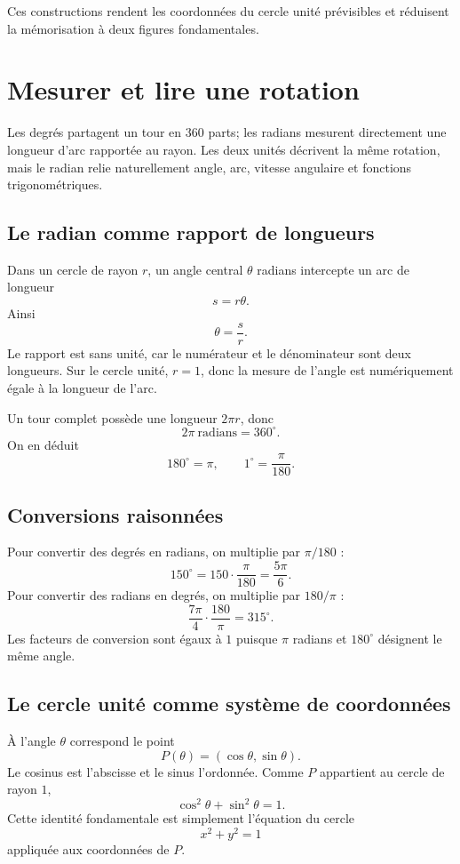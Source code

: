 \documentclass[12pt,a4paper,openany]{book}
\begin{document}
Ces constructions rendent les coordonnées du cercle unité prévisibles et réduisent la mémorisation à deux figures fondamentales.


\section{Mesurer et lire une rotation}

Les degrés partagent un tour en $360$ parts; les radians mesurent directement une longueur d'arc rapportée au rayon. Les deux unités décrivent la même rotation, mais le radian relie naturellement angle, arc, vitesse angulaire et fonctions trigonométriques.

\subsection{Le radian comme rapport de longueurs}

Dans un cercle de rayon $r$, un angle central $\theta$ radians intercepte un arc de longueur
\[
s=r\theta.
\]
Ainsi
\[
\theta=\frac sr.
\]
Le rapport est sans unité, car le numérateur et le dénominateur sont deux longueurs. Sur le cercle unité, $r=1$, donc la mesure de l'angle est numériquement égale à la longueur de l'arc.

Un tour complet possède une longueur $2\pi r$, donc
\[
2\pi\ \text{radians}=360^\circ.
\]
On en déduit
\[
180^\circ=\pi,
\qquad
1^\circ=\frac\pi{180}.
\]

\subsection{Conversions raisonnées}

Pour convertir des degrés en radians, on multiplie par $\pi/180$ :
\[
150^\circ=150\cdot\frac\pi{180}=\frac{5\pi}{6}.
\]
Pour convertir des radians en degrés, on multiplie par $180/\pi$ :
\[
\frac{7\pi}{4}\cdot\frac{180}{\pi}=315^\circ.
\]
Les facteurs de conversion sont égaux à $1$ puisque $\pi$ radians et $180^\circ$ désignent le même angle.

\subsection{Le cercle unité comme système de coordonnées}

À l'angle $\theta$ correspond le point
\[
P(\theta)=(\cos\theta,\sin\theta).
\]
Le cosinus est l'abscisse et le sinus l'ordonnée. Comme $P$ appartient au cercle de rayon $1$,
\[
\cos^2\theta+\sin^2\theta=1.
\]
Cette identité fondamentale est simplement l'équation du cercle
\[
x^2+y^2=1
\]
appliquée aux coordonnées de $P$.
\end{document}
